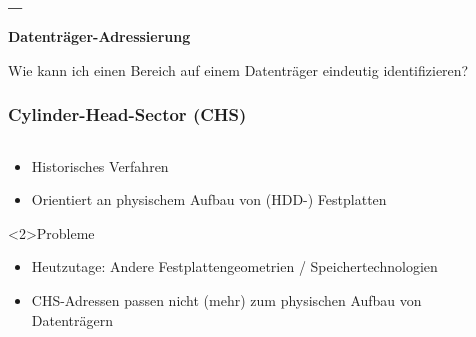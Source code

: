 \begin{frame}
    \frametitle{\_}

    \begin{center}
        \vspace{1cm}
        \Huge{\textbf{Datenträger-Adressierung}}

        \vspace{0.5cm}
        \LARGE{Wie kann ich einen Bereich auf einem Datenträger eindeutig identifizieren?}
    \end{center}
\end{frame}

\begin{frame}
    \frametitle{Cylinder-Head-Sector (CHS)}

    \begin{columns}[T]
        \begin{column}{0.4\textwidth}
            
            \begin{itemize}
                \item Historisches Verfahren
                \vspace{0.2cm}
                \item Orientiert an physischem Aufbau von (HDD-) Festplatten
            \end{itemize}

            \vspace{1cm}
            \begin{alertblock}<2>{Probleme}
                \begin{itemize}
                    \item Heutzutage: Andere Festplattengeometrien / Speichertechnologien
                    
                    \vspace{0.2cm}

                    \item CHS-Adressen passen nicht (mehr) zum physischen Aufbau von Datenträgern
                \end{itemize}
            \end{alertblock}
        \end{column}

        \begin{column}{0.4\textwidth}
            
        \end{column}
    \end{columns}
\end{frame}

